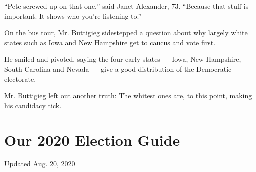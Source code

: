``Pete screwed up on that one,'' said Janet Alexander, 73. ``Because
that stuff is important. It shows who you're listening to.''

On the bus tour, Mr. Buttigieg sidestepped a question about why largely
white states such as Iowa and New Hampshire get to caucus and vote
first.

He smiled and pivoted, saying the four early states --- Iowa, New
Hampshire, South Carolina and Nevada --- give a good distribution of the
Democratic electorate.

Mr. Buttigieg left out another truth: The whitest ones are, to this
point, making his candidacy tick.

\hypertarget{our-2020-election-guide}{%
\section{Our 2020 Election Guide}\label{our-2020-election-guide}}

Updated Aug. 20, 2020

